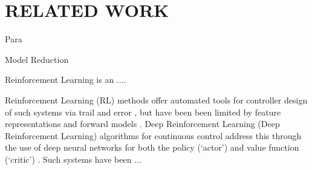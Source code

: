 \documentclass[letterpaper, 10 pt, conference]{ieeeconf}
\begin{document}
\lipsum[1-4]

\section{RELATED WORK}





{Para}






















{Model Reduction}






Reinforcement Learning is an ....  

Reinforcement Learning (RL) methods offer automated tools for controller design of such systems via trail and error \cite{sutton1998reinforcement}, but have been been limited by feature representations and forward models \cite{duan2016benchmarking}.
Deep Reinforcement Learning (Deep Reinforcement Learning) algorithms for continuous control address this through the use of deep neural networks for both the policy (`actor') and value function (`critic') \cite{DDPG, SAC}.
Such systems have been  ...
\end{document}
